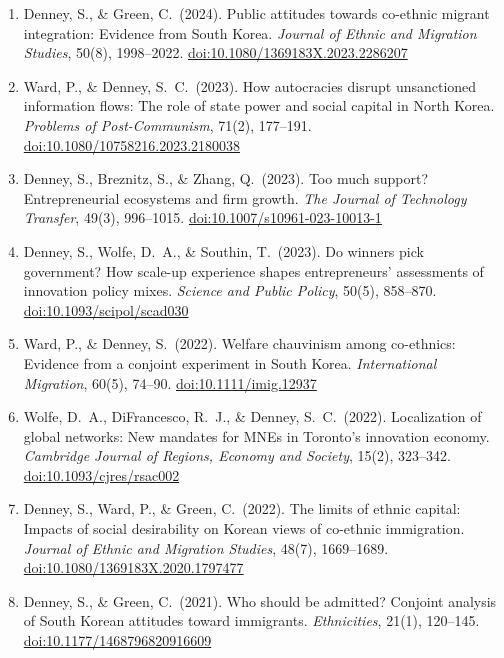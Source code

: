 \documentclass[11pt, a4paper]{article}
\begin{document}
\begin{enumerate}[itemsep=0.15em]
  \item Denney, S., \& Green, C.\ (2024). Public attitudes towards co-ethnic migrant integration: Evidence from South Korea. \textit{Journal of Ethnic and Migration Studies}, 50(8), 1998--2022. \href{https://doi.org/10.1080/1369183X.2023.2286207}{doi:10.1080/1369183X.2023.2286207}

  \item Ward, P., \& Denney, S.\ C.\ (2023). How autocracies disrupt unsanctioned information flows: The role of state power and social capital in North Korea. \textit{Problems of Post-Communism}, 71(2), 177--191. \href{https://doi.org/10.1080/10758216.2023.2180038}{doi:10.1080/10758216.2023.2180038}

  \item Denney, S., Breznitz, S., \& Zhang, Q.\ (2023). Too much support? Entrepreneurial ecosystems and firm growth. \textit{The Journal of Technology Transfer}, 49(3), 996--1015. \href{https://doi.org/10.1007/s10961-023-10013-1}{doi:10.1007/s10961-023-10013-1}

  \item Denney, S., Wolfe, D.\ A., \& Southin, T.\ (2023). Do winners pick government? How scale-up experience shapes entrepreneurs' assessments of innovation policy mixes. \textit{Science and Public Policy}, 50(5), 858--870. \href{https://doi.org/10.1093/scipol/scad030}{doi:10.1093/scipol/scad030}

  \item Ward, P., \& Denney, S.\ (2022). Welfare chauvinism among co-ethnics: Evidence from a conjoint experiment in South Korea. \textit{International Migration}, 60(5), 74--90. \href{https://doi.org/10.1111/imig.12937}{doi:10.1111/imig.12937}

  \item Wolfe, D.\ A., DiFrancesco, R.\ J., \& Denney, S.\ C.\ (2022). Localization of global networks: New mandates for MNEs in Toronto's innovation economy. \textit{Cambridge Journal of Regions, Economy and Society}, 15(2), 323--342. \href{https://doi.org/10.1093/cjres/rsac002}{doi:10.1093/cjres/rsac002}

  \item Denney, S., Ward, P., \& Green, C.\ (2022). The limits of ethnic capital: Impacts of social desirability on Korean views of co-ethnic immigration. \textit{Journal of Ethnic and Migration Studies}, 48(7), 1669--1689. \href{https://doi.org/10.1080/1369183X.2020.1797477}{doi:10.1080/1369183X.2020.1797477}

  \item Denney, S., \& Green, C.\ (2021). Who should be admitted? Conjoint analysis of South Korean attitudes toward immigrants. \textit{Ethnicities}, 21(1), 120--145. \href{https://doi.org/10.1177/1468796820916609}{doi:10.1177/1468796820916609}


\end{enumerate}
\end{document}
